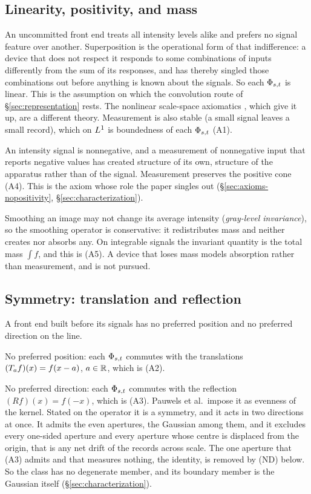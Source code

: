 \subsection{Linearity, positivity, and mass}\label{sec:axioms-linearity}

An uncommitted front end treats all intensity levels alike and prefers no signal feature
over another. Superposition is the operational form of that indifference: a device that
does not respect it responds to some combinations of inputs differently from the sum of
its responses, and has thereby singled those combinations out before anything is known
about the signals. So each $\Phi_{s,t}$ is linear. This is the assumption on which the
convolution route of \S\ref{sec:representation} rests. The nonlinear scale-space
axiomatics , which give it up, are a different theory. Measurement
is also stable (a small signal leaves a small record), which on $L^1$ is boundedness
of each $\Phi_{s,t}$ (A1).

An intensity signal is nonnegative, and a measurement of nonnegative input that reports
negative values has created structure of its own, structure of the apparatus rather
than of the signal. Measurement preserves the positive cone (A4). This is the axiom whose
role the paper singles out (\S\ref{sec:axioms-nopositivity}, \S\ref{sec:characterization}).

Smoothing an image may not change its average intensity (\emph{gray-level invariance}),
so the smoothing operator is conservative: it redistributes mass and neither creates
nor absorbs any. On integrable signals the invariant quantity is the total mass $\int f$,
and this is (A5). A device that loses mass models absorption rather than measurement, and
is not pursued.

\subsection{Symmetry: translation and reflection}\label{sec:axioms-symmetry}

A front end built before its signals has no preferred position and no preferred
direction on the line.

No preferred position: each $\Phi_{s,t}$ commutes with the translations
$(T_{a}f)(x) = f(x - a)$, $a \in \mathbb{R}$, which is (A2).

No preferred direction: each $\Phi_{s,t}$ commutes with the reflection $(Rf)(x) = f(-x)$,
which is (A3). Pauwels et al.\ impose it as evenness of the kernel. Stated on the operator
it is a symmetry, and it acts in two directions at once. It admits the even apertures, the
Gaussian among them, and it excludes every one-sided aperture and every aperture whose
centre is displaced from the origin, that is any net drift of the records across scale. The
one aperture that (A3) admits and that measures nothing, the identity, is removed by (ND)
below. So the class has no degenerate member, and its boundary member is the Gaussian
itself (\S\ref{sec:characterization}).

